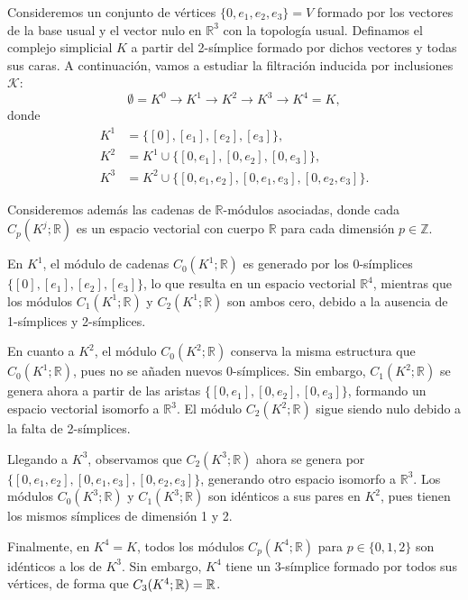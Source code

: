 \begin{ejemplo}
	\label{ex:pers-homology} Consideremos un conjunto de vértices $\{0, e_{1}, e_{2}
	, e_{3}\} = V$ formado por los vectores de la base usual y el vector nulo en $\mathbb{R}
	^{3}$ con la topología usual. Definamos el complejo simplicial $K$ a partir
	del 2-símplice formado por dichos vectores y todas sus caras. A continuación,
	vamos a estudiar la filtración inducida por inclusiones $\mathcal{K}$:
	\[
	\emptyset = K^{0} \to K^{1} \to K^{2} \to K^{3} \to K^{4} = K,
	\]
	donde
	\begin{align*}
		K^{1} & = \{[0], [e_{1}], [e_{2}], [e_{3}]\},                                     \\
		K^{2} & = K^{1} \cup \{[0, e_{1}], [0, e_{2}], [0, e_{3}]\},                      \\
		K^{3} & = K^{2} \cup \{[0, e_{1}, e_{2}], [0, e_{1}, e_{3}], [0, e_{2}, e_{3}]\}.
	\end{align*}
	
	Consideremos además las cadenas de $\mathbb{R}$-módulos asociadas, donde cada $C
	_{p}(K^{j};\mathbb{R})$ es un espacio vectorial con cuerpo $\mathbb{R}$ para cada
	dimensión $p \in \mathbb{Z}$.
	
	En $K^{1}$, el módulo de cadenas $C_{0}(K^{1}; \mathbb{R})$ es generado por
	los 0-símplices $\{ [0], [e_{1}], [e_{2}], [e_{3}] \}$, lo que resulta en un espacio
	vectorial $\mathbb{R}^{4}$, mientras que los módulos
	$C_{1}(K^{1}; \mathbb{R})$ y $C_{2}(K^{1}; \mathbb{R})$ son ambos cero, debido
	a la ausencia de 1-símplices y 2-símplices.
	
	En cuanto a $K^{2}$, el módulo $C_{0}(K^{2}; \mathbb{R})$ conserva la misma
	estructura que $C_{0}(K^{1}; \mathbb{R})$, pues no se añaden nuevos 0-símplices.
	Sin embargo, $C_{1}(K^{2}; \mathbb{R})$ se genera ahora a partir de las aristas
	$\{ [0, e_{1}], [0, e_{2}], [0, e_{3}] \}$, formando un espacio vectorial
	isomorfo a $\mathbb{R}^{3}$. El módulo $C_{2}(K^{2}; \mathbb{R})$ sigue siendo
	nulo debido a la falta de 2-símplices.
	
	Llegando a $K^{3}$, observamos que $C_{2}(K^{3}; \mathbb{R})$ ahora se genera
	por $\{ [0, e_{1}, e_{2}], [0, e_{1}, e_{3}], [0, e_{2}, e_{3}] \}$, generando
	otro espacio isomorfo a $\mathbb{R}^{3}$. Los módulos
	$C_{0}(K^{3}; \mathbb{R})$ y $C_{1}(K^{3}; \mathbb{R})$ son idénticos a sus
	pares en $K^{2}$, pues tienen los mismos símplices de dimensión 1 y 2.
	
	Finalmente, en $K^{4} = K$, todos los módulos $C_{p}(K^{4}; \mathbb{R})$ para
	$p \in \{ 0, 1, 2 \}$ son idénticos a los de $K^{3}$. Sin embargo, $K^{4}$
	tiene un 3-símplice formado por todos sus vértices, de forma que $C_{3}(K^{4};
	\mathbb{R}) = \mathbb{R}$.
	

\end{ejemplo}
